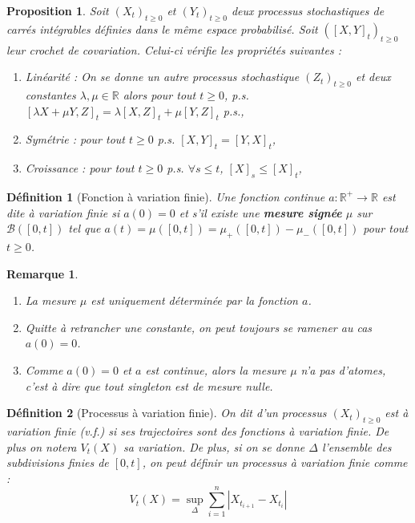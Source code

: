 \documentclass[openany]{book}
\newcommand{\R}{\mathbb{R}}
\newcommand{\1}{\mathbbm{1}}
\theoremstyle{thmfont}
\theoremstyle{deffont}
\newtheorem{definition}[definition]{Définition}
\theoremstyle{thmfont}
\newtheorem{prop}[prop]{Proposition}
\theoremstyle{deffont}
\newtheorem{remark}[remark]{Remarque}
\begin{document}
\begin{prop} Soit $(X_t)_{t\geq0}$ et $(Y_t)_{t\geq0}$ deux processus stochastiques de carrés intégrables définies dans le même espace probabilisé. Soit $([X,Y]_t)_{t\geq0}$ leur crochet de covariation. Celui-ci vérifie les propriétés suivantes : 
  \begin{enumerate}
  \item Linéarité : On se donne un autre processus stochastique $(Z_t)_{t\geq0}$ et deux constantes $\lambda, \mu \in \R$ alors pour tout $t\geq0$, p.s. $[\lambda X + \mu Y, Z]_t = \lambda[X,Z]_t + \mu[Y,Z]_t$ p.s.,
  \item Symétrie : pour tout $t\geq0$ p.s. $[X,Y]_t = [Y,X]_t$,
  \item Croissance : pour tout $t\geq0$ p.s. $\forall s\leq t$, $[X]_s \leq [X]_t$,
  \end{enumerate}
\end{prop}

\begin{definition}[Fonction à variation finie] Une fonction continue $a : \R^+ \rightarrow \R$ est dite \textit{à variation finie} si $a(0) = 0$ et s'il existe une \textbf{mesure
    signée} $\mu$ sur $\mathcal B([0,t])$ tel que $a(t) = \mu([0,t]) = \mu_+([0,t]) - \mu_-([0,t])$ pour tout $t \geq 0$.
\label{def:fct_var_finie}
\end{definition}

\begin{remark}
  \begin{enumerate}
  \item La mesure $\mu$ est uniquement déterminée par la fonction $a$.
  \item Quitte à retrancher une constante, on peut toujours se ramener au cas $a(0) = 0$.
  \item Comme $a(0) = 0$ et $a$ est continue, alors la mesure $\mu$ n'a pas d'\textit{atomes}, c'est à dire que tout singleton est de mesure nulle.
  \end{enumerate}
\end{remark}

\begin{definition}[Processus à variation finie]
  On dit d'un processus $(X_t)_{t\geq0}$ est \textit{à variation finie} (v.f.) si ses trajectoires sont des fonctions à variation finie. De plus on notera $V_t(X)$ sa variation. De plus, si on se donne $\Delta$ l'ensemble des subdivisions finies de $[0,t]$, on peut définir un processus à variation finie comme :
%
  $$V_t(X) = \sup_{\Delta} \sum_{i=1}^n |X_{t_{i+1}} - X_{t_{i}}|$$
\end{definition}
\end{document}

